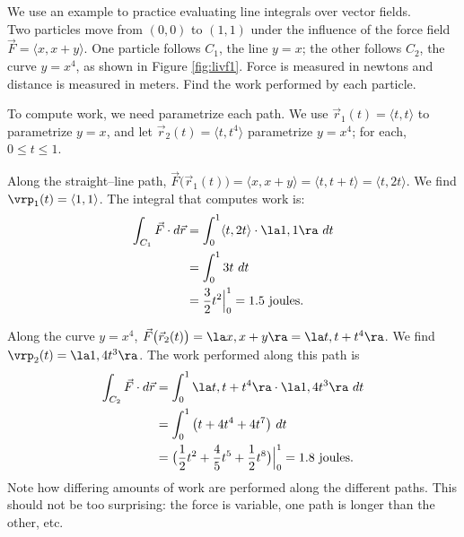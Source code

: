 We use an example to practice evaluating line integrals over vector fields.\\

{Two particles move from $(0,0)$ to $(1,1)$ under the influence of the force field $\vec F  = \langle x, x+y\rangle$. One particle follows $C_1$, the line $y=x$; the other follows $C_2$, the curve $y=x^4$, as shown in Figure \ref{fig:livf1}. Force is measured in newtons and distance is measured in meters. Find the work performed by each particle.
}
{To compute work, we need parametrize each path. We use $\vec r_1(t) = \langle t,t\rangle$ to parametrize $y=x$, and let $\vec r_2(t) =\langle t,t^4\rangle$ parametrize $y=x^4$; for each, $0\leq t\leq 1$. 

Along the straight--line path, $\vec F\big(\vec r_1(t)\big) = \langle x, x+y\rangle = \langle t, t+t\rangle = \langle t,2t\rangle$. We find $\vrp_1(t) =\langle 1,1\rangle$. The integral that computes work is:
\begin{align*}
\int_{C_1} \vec F\cdot d\vec r &= \int_0^1 \langle t,2t\rangle\cdot\la 1,1\ra\ dt \\
			&= \int_0^1 3t\ dt \\
			&= \frac32t^2\Big|_0^1 = 1.5 \text{ joules}.
\end{align*}

Along the curve $y = x^4$, $\vec F\big(\vec r_2(t)\big) = \la x, x+y\ra = \la t, t+t^4\ra$. We find $\vrp_2(t) = \la 1, 4t^3\ra$. The work performed along this path is
\begin{align*}
\int_{C_2} \vec F\cdot d\vec r &= \int_0^1 \la t,t+t^4\ra\cdot\la 1,4t^3\ra\ dt\\
			&= \int_0^1 \big(t + 4t^4+ 4t^7\big)\ dt \\
			&= \big(\frac12t^2 + \frac45t^5 + \frac12t^8\big)\Big|_0^1 =  1.8 \text{ joules}.
\end{align*}
Note how differing amounts of work are performed along the different paths. This should not be too surprising: the force is variable, one path is longer than the other, etc.
}\\

